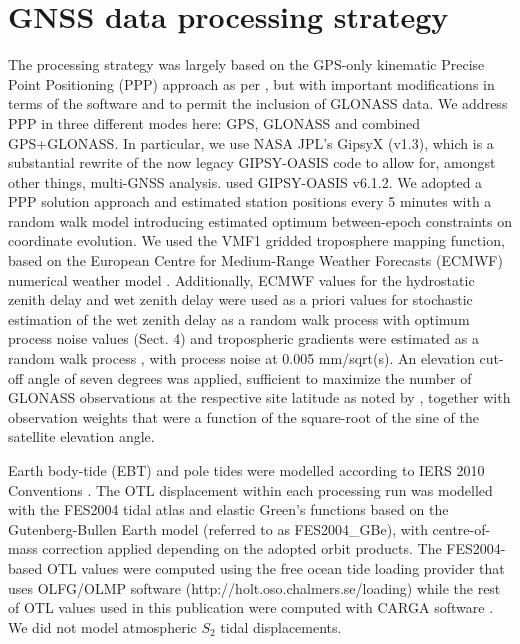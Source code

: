 \documentclass[se, manuscript]{copernicus}
\begin{document}
\section{GNSS data processing strategy}

The processing strategy was largely based on the GPS-only kinematic Precise Point Positioning (PPP) approach \citep{Zumberge1997} %
as per \cite{Penna2015}, but with important modifications in terms of the software and to permit the inclusion of GLONASS data. We address PPP in three different modes here: GPS, GLONASS and combined GPS+GLONASS. In particular, we use NASA JPL’s GipsyX (v1.3), which is a substantial rewrite of the now legacy GIPSY-OASIS code to allow for, amongst other things, multi-GNSS analysis. \cite{Penna2015} used GIPSY-OASIS v6.1.2.
We adopted a PPP solution approach and estimated station positions every 5 minutes with a random walk model introducing estimated optimum between-epoch constraints on coordinate evolution. We used the VMF1 gridded troposphere mapping function, based on the European Centre for Medium-Range Weather Forecasts (ECMWF) numerical weather model \citep{Boehm2006}. Additionally, ECMWF values for the hydrostatic zenith delay and wet zenith delay were used as a priori values for stochastic estimation of the wet zenith delay as a random walk process with optimum process noise values (Sect. 4) and tropospheric gradients were estimated as a random walk process \citep{Bar-Sever1998}, with process noise at 0.005 mm/sqrt(s). An elevation cut-off angle of seven degrees was applied, sufficient to maximize the number of GLONASS observations at the respective site latitude as noted by \cite{abbaszadeh_benefits_2020}, together with observation weights that were a function of the square-root of the sine of the satellite elevation angle.

Earth body-tide (EBT) and pole tides were modelled according to IERS 2010 Conventions \citep{IERS2010}. The OTL displacement within each processing run was modelled with the FES2004 tidal atlas \citep{Lyard2006} and elastic Green’s functions based on the Gutenberg-Bullen Earth model \citep{Farrell1972} (referred to as FES2004\_GBe), with centre-of-mass correction applied depending on the adopted orbit products. The FES2004-based OTL values were computed using the free ocean tide loading provider that uses OLFG/OLMP software (http://holt.oso.chalmers.se/loading) while the rest of OTL values used in this publication were computed with CARGA software \citep{bos_baker_2005}. We did not model atmospheric $S_2$ tidal displacements.
\end{document}
